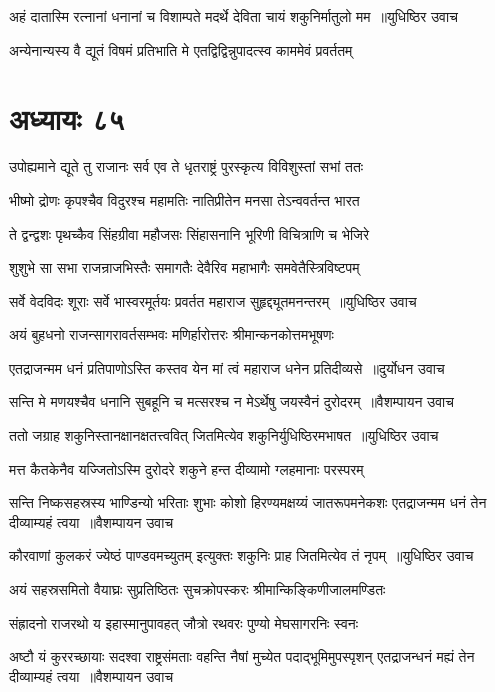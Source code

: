 \twolineshloka
{अहं दातास्मि रत्नानां धनानां च विशाम्पते}
{मदर्थे देविता चायं शकुनिर्मातुलो मम ॥युधिष्ठिर उवाच}


\twolineshloka
{अन्येनान्यस्य वै द्यूतं विषमं प्रतिभाति मे}
{एतद्विद्विन्नुपादत्स्व काममेवं प्रवर्ततम्}


\chapter{अध्यायः ८५}
\twolineshloka
{उपोह्यमाने द्यूते तु राजानः सर्व एव ते}
{धृतराष्ट्रं पुरस्कृत्य विविशुस्तां सभां ततः}


\twolineshloka
{भीष्मो द्रोणः कृपश्चैव विदुरश्च महामतिः}
{नातिप्रीतेन मनसा तेऽन्ववर्तन्त भारत}


\twolineshloka
{ते द्वन्द्वशः पृथच्कैव सिंहग्रीवा महौजसः}
{सिंहासनानि भूरिणी विचित्राणि च भेजिरे}


\twolineshloka
{शुशुभे सा सभा राजन्राजभिस्तैः समागतैः}
{देवैरिव महाभागैः समवेतैस्त्रिविष्टपम्}


\twolineshloka
{सर्वे वेदविदः शूराः सर्वे भास्वरमूर्तयः}
{प्रवर्तत महाराज सुहृद्द्यूतमनन्तरम् ॥युधिष्ठिर उवाच}


\twolineshloka
{अयं बुहधनो राजन्सागरावर्तसम्भवः}
{मणिर्हारोत्तरः श्रीमान्कनकोत्तमभूषणः}


\twolineshloka
{एतद्राजन्मम धनं प्रतिपाणोऽस्ति कस्तव}
{येन मां त्वं महाराज धनेन प्रतिदीव्यसे ॥दुर्योधन उवाच}


\twolineshloka
{सन्ति मे मणयश्चैव धनानि सुबहूनि च}
{मत्सरश्च न मेऽर्थेषु जयस्वैनं दुरोदरम् ॥वैशम्पायन उवाच}


\twolineshloka
{ततो जग्राह शकुनिस्तानक्षानक्षतत्त्ववित्}
{जितमित्येव शकुनिर्युधिष्ठिरमभाषत ॥युधिष्ठिर उवाच}


\twolineshloka
{मत्त कैतकेनैव यज्जितोऽस्मि दुरोदरे}
{शकुने हन्त दीव्यामो ग्लहमानाः परस्परम्}


\threelineshloka
{सन्ति निष्कसहस्रस्य भाण्डिन्यो भरिताः शुभाः}
{कोशो हिरण्यमक्षय्यं जातरूपमनेकशः}
{एतद्राजन्मम धनं तेन दीव्याम्यहं त्वया ॥वैशम्पायन उवाच}


\twolineshloka
{कौरवाणां कुलकरं ज्येष्ठं पाण्डवमच्युतम्}
{इत्युक्तः शकुनिः प्राह जितमित्येव तं नृपम् ॥युधिष्ठिर उवाच}


\twolineshloka
{अयं सहस्रसमितो वैयाघ्रः सुप्रतिष्ठितः}
{सुचक्रोपस्करः श्रीमान्किङ्किणीजालमण्डितः}


\twolineshloka
{संह्रादनो राजरथो य इहास्मानुपावहत्}
{जौत्रो रथवरः पुण्यो मेघसागरनिः स्वनः}


\threelineshloka
{अष्टौ यं कुररच्छायाः सदश्वा राष्ट्रसंमताः}
{वहन्ति नैषां मुच्येत पदाद्भूमिमुपस्पृशन्}
{एतद्राजन्धनं मह्यं तेन दीव्याम्यहं त्वया ॥वैशम्पायन उवाच}



